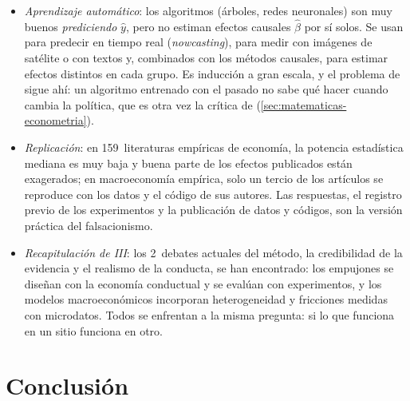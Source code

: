 \documentclass[11pt]{article}
\begin{document}
\begin{itemize}
\item \emph{Aprendizaje automático}: los algoritmos (árboles, redes neuronales) son muy buenos \emph{prediciendo} $\hat y$, pero no estiman efectos causales $\hat\beta$ por sí solos\nocite{MullainathanSpiess2017Machine}. Se usan para predecir en tiempo real (\emph{nowcasting}), para medir con imágenes de satélite o con textos y, combinados con los métodos causales, para estimar efectos distintos en cada grupo\nocite{AtheyImbens2019Machine}. Es inducción a gran escala, y el problema de  sigue ahí: un algoritmo entrenado con el pasado no sabe qué hacer cuando cambia la política, que es otra vez la crítica de  (\ref{sec:matematicas-econometria}).
\item \emph{Replicación}: en 159~literaturas empíricas de economía, la potencia estadística mediana es muy baja y buena parte de los efectos publicados están exagerados\nocite{IoannidisStanleyDoucouliagos2017}; en macroeconomía empírica, solo un tercio de los artículos se reproduce con los datos y el código de sus autores\nocite{ChangLi2022Replicable}. Las respuestas, el registro previo de los experimentos y la publicación de datos y códigos, son la versión práctica del falsacionismo.
\item \emph{Recapitulación de III}: los 2~debates actuales del método, la credibilidad de la evidencia y el realismo de la conducta, se han encontrado: los empujones se diseñan con la economía conductual y se evalúan con experimentos, y los modelos macroeconómicos incorporan heterogeneidad y fricciones medidas con microdatos. Todos se enfrentan a la misma pregunta: si lo que funciona en un sitio funciona en otro.
\end{itemize}

\section*{Conclusión}
\end{document}
